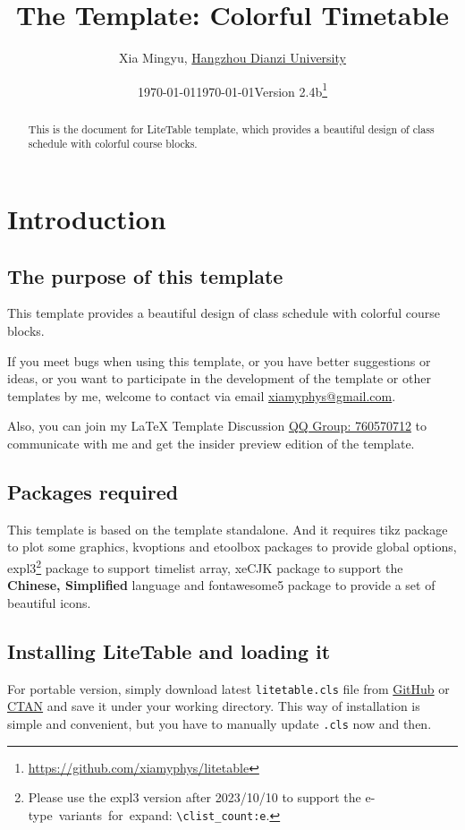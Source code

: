 \documentclass[11pt]{article}
\title{\bfseries The \pkg{LiteTable} Template: Colorful Timetable}
\author{Xia Mingyu, \href{https://www.hdu.edu.cn}{Hangzhou Dianzi University}}
\date{\today}
\affil{\href{mailto:xiamyphys@gmail.com}{\ttfamily xiamyphys@gmail.com}}
\date{\today\quad Version 2.4b\thanks{%
  \url{https://github.com/xiamyphys/litetable}}}
\def\pkg#1{\texorpdfstring{\textcolor{pkgcolor}{\textsf{#1}}}{“#1”}}
\def\cmd#1{\texorpdfstring{\textcolor{cmdcolor}{\textsf{#1}}}{“#1”}}
\begin{document}
\maketitle

\vspace{-2em}
\begin{abstract}
This is the document for \pkg{LiteTable} template, which provides a beautiful design of class schedule with colorful course blocks.
\end{abstract}

\tableofcontents

\clearpage

\section{Introduction}

\subsection{The purpose of this template}
This template provides a beautiful design of class schedule with colorful course blocks.

If you meet bugs when using this template, or you have better suggestions or ideas, or you want to participate in the development of the template or other templates by me, welcome to contact via email \href{mailto:xiamyphys@gmail.com}{\ttfamily xiamyphys@gmail.com}.

Also, you can join my \textsf\LaTeX{} Template Discussion \href{https://qm.qq.com/q/OnHzbNvVAG}{QQ Group: 760570712} to communicate with me and get the insider preview edition of the template.

\subsection{Packages required}
This template is based on the template \pkg{standalone}. And it requires \pkg{tikz} package to plot some graphics, \pkg{kvoptions} and \pkg{etoolbox} packages to provide global options, \pkg{expl3}\footnote{Please use the \pkg{expl3} version after 2023/10/10 to support the e-type variants for expand: \verb|\clist_count:e|.} package to support \cmd{timelist} array, \pkg{xeCJK} package to support the \textbf{Chinese, Simplified} language and \pkg{fontawesome5} package to provide a set of beautiful icons.

\subsection{Installing \pkg{LiteTable} and loading it}
For portable version, simply download latest \verb|litetable.cls| file from \href{https://github.com/xiamyphys/LiteTable}{GitHub} or \href{https://ctan.org/pkg/litetable}{CTAN} and save it under your working directory. This way of installation is simple and convenient, but you have to manually update \verb|.cls| now and then.
\end{document}
